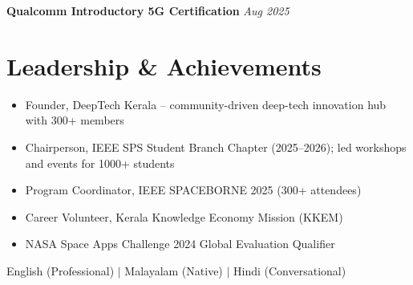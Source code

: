 \documentclass[10pt,a4paper]{article}
\newcommand{\role}[2]{\textbf{#1} \hfill \textit{#2}}
\begin{document}
\role{Qualcomm Introductory 5G Certification}{Aug 2025}

\section*{Leadership \& Achievements}

\begin{itemize}
    \item Founder, DeepTech Kerala -- community-driven deep-tech innovation hub with 300+ members
    \item Chairperson, IEEE SPS Student Branch Chapter (2025--2026); led workshops and events for 1000+ students
    \item Program Coordinator, IEEE SPACEBORNE 2025 (300+ attendees)
    \item Career Volunteer, Kerala Knowledge Economy Mission (KKEM)
    \item NASA Space Apps Challenge 2024 Global Evaluation Qualifier
\end{itemize}

\vspace{6pt}
\begin{center}
\small English (Professional) \quad $|$ \quad Malayalam (Native) \quad $|$ \quad Hindi (Conversational)
\end{center}
\end{document}

